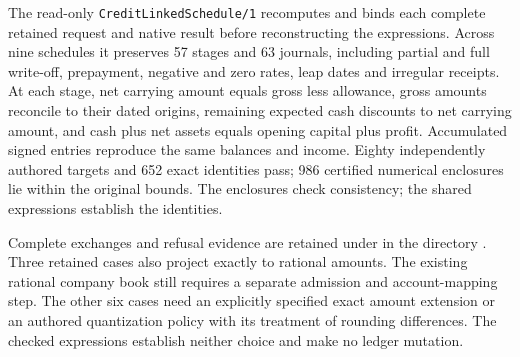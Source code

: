 The read-only \texttt{CreditLinkedSchedule/1} recomputes and binds each complete
retained request and native result before reconstructing the expressions.
Across nine schedules it preserves 57 stages and 63 journals, including
partial and full write-off, prepayment, negative and zero rates, leap dates
and irregular receipts. At each stage, net carrying amount equals gross less
allowance, gross amounts reconcile to their dated origins, remaining expected
cash discounts to net carrying amount, and cash plus net assets equals opening
capital plus profit. Accumulated signed entries reproduce the same balances
and income. Eighty independently authored targets and 652 exact identities
pass; 986 certified numerical enclosures lie within the original bounds. The
enclosures check consistency; the shared expressions establish the identities.

Complete exchanges and refusal evidence are retained under
{\small{}} in the directory
{\small{}}. Three
retained cases also project exactly to rational amounts. The existing rational
company book still requires a separate admission and account-mapping step.
The other six cases need an explicitly specified exact amount extension or
an authored quantization policy with its treatment of rounding differences.
The checked expressions establish neither choice and make no ledger mutation.
